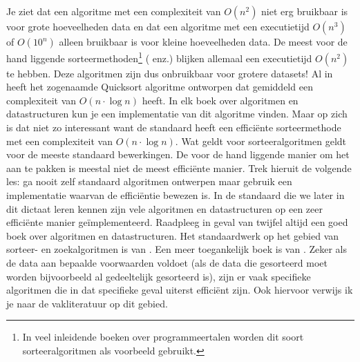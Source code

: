 \begin{cpplstShortInline}
Je ziet dat een algoritme met een complexiteit van $O(n^2)$ niet erg bruikbaar is voor grote hoeveelheden data en dat een algoritme met een executietijd $O(n^3)$ of $O(10^n)$ alleen bruikbaar is voor kleine hoeveelheden data.
De meest voor de hand liggende sorteermethoden\footnote{In veel inleidende boeken over programmeertalen worden dit soort sorteeralgoritmen als voorbeeld gebruikt.} ( enz.) blijken allemaal een executietijd $O(n^2)$ te hebben.
Deze algoritmen zijn dus onbruikbaar voor grotere datasets! 
Al in \citeyear{Hoare1962} heeft \citeauthor{Hoare1962} het zogenaamde Quicksort algoritme \cite{Hoare1962} ontworpen dat gemiddeld een complexiteit van $O(n\cdot\log{n})$ heeft.
In elk boek over algoritmen en datastructuren kun je een implementatie van dit algoritme vinden.
Maar op zich is dat niet zo interessant want de standaard \Cpp{}  heeft een efficiënte sorteermethode met een complexiteit van $O(n\cdot\log{n})$.
Wat geldt voor sorteeralgoritmen geldt voor de meeste standaard bewerkingen.
De voor de hand liggende manier om het aan te pakken is meestal niet de meest efficiënte manier.
Trek hieruit de volgende les: ga nooit zelf standaard algoritmen ontwerpen maar gebruik een implementatie waarvan de efficiëntie bewezen is.
In de standaard \Cpp{}  die we later in dit dictaat leren kennen zijn vele algoritmen en datastructuren op een zeer efficiënte manier geïmplementeerd.
Raadpleeg in geval van twijfel altijd een goed boek over algoritmen en datastructuren.
Het standaardwerk op het gebied van sorteer- en zoekalgoritmen is  \cite{Knuth1998} van \citeauthor{Knuth1998}.
Een meer toegankelijk boek is  \cite{Sedgewick1998} van \citeauthor{Sedgewick1998}.
Zeker als de data aan bepaalde voorwaarden voldoet (als de data die gesorteerd moet worden bijvoorbeeld al gedeeltelijk gesorteerd is), zijn er vaak specifieke algoritmen die in dat specifieke geval uiterst efficiënt zijn.
Ook hiervoor verwijs ik je naar de vakliteratuur op dit gebied.


\end{cpplstShortInline}
